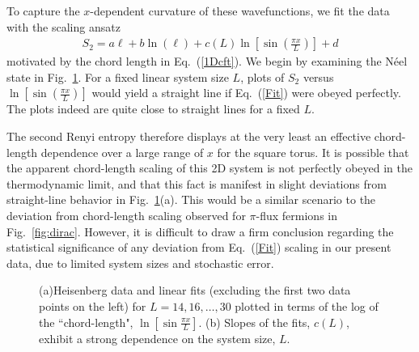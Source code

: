 \documentclass[prl,aps,twocolumn,floatfix,amsmath,amssymb,superscriptaddress,tightenlines]{revtex4}
\begin{document}
To capture the $x$-dependent curvature of these wavefunctions, we fit the data with the scaling ansatz
\begin{align}
S_2= a \ell + b\ln(\ell)
+ c(L) \ln \left[{ \sin\left({ \frac{\pi x}{L} }\right) }\right] + d \label{Fit}
\end{align}
motivated by the chord length in Eq.~(\ref{1Dcft}).
We begin by examining the N\'eel state in Fig.~{\ref{fig:heis_lines}}.  For a fixed linear system size $L$, plots of $S_2$ versus $ \ln \left[{ \sin\left({ \frac{\pi x}{L} }\right) }\right] $ would yield a straight line if Eq.~(\ref{Fit}) were obeyed perfectly.  The plots indeed are quite close to straight lines for a fixed $L$.

The second Renyi entropy therefore displays at the very least an effective chord-length dependence over a large range of $x$ for the square torus. It is possible that the apparent chord-length scaling of this 2D system is not perfectly obeyed in the thermodynamic limit, and that this fact is manifest in slight deviations from straight-line behavior in Fig.~{\ref{fig:heis_lines}}(a).
This would be a similar scenario to the deviation from chord-length scaling observed for $\pi$-flux fermions in Fig.~\ref{fig:dirac}.  
However, it is difficult to draw a firm conclusion regarding the statistical significance of any deviation from Eq.~(\ref{Fit}) scaling in our
present data, due to limited system sizes and stochastic error.

 \begin{figure}
   \begin{center}
   \end{center}
   \caption{(a)Heisenberg data and linear fits (excluding the first two data points on the left) for $L=14,16,\dots,30$ plotted in terms of the log of the ``chord-length", $\ln\left[\sin \frac{\pi x}{L}\right]$.
   (b) Slopes of the fits, $c(L)$, exhibit a strong dependence on the system size, $L$.
   }
   \label{fig:heis_lines}
 \end{figure}
\end{document}
